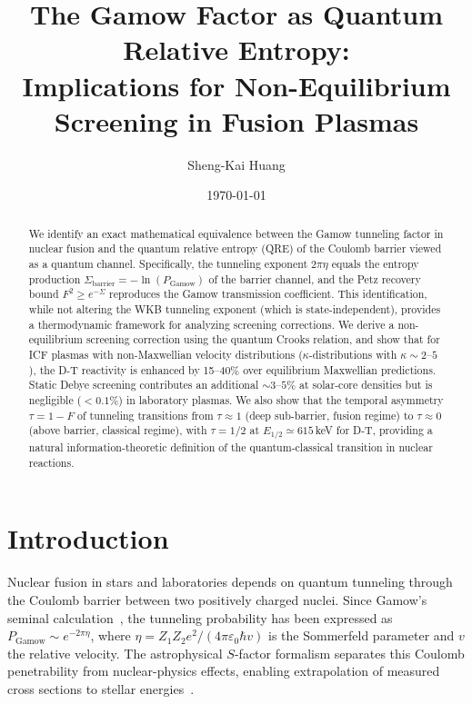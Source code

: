 \documentclass[prc,twocolumn,superscriptaddress,longbibliography,floatfix]{revtex4-2}
\newcommand{\tauasym}{\tau}
\newcommand{\PGam}{P_{\mathrm{Gamow}}}
\newcommand{\Sbar}{\Sigma_{\mathrm{barrier}}}
\begin{document}
\title{The Gamow Factor as Quantum Relative Entropy:\\
Implications for Non-Equilibrium Screening in Fusion Plasmas}

\author{Sheng-Kai Huang}

\date{\today}

\begin{abstract}
We identify an exact mathematical equivalence between the Gamow
tunneling factor in nuclear fusion and the quantum relative entropy (QRE)
of the Coulomb barrier viewed as a quantum channel.  Specifically, the
tunneling exponent $2\pi\eta$ equals the entropy production
$\Sbar = -\ln(\PGam)$ of the barrier channel, and the Petz recovery
bound $F^{2} \geq e^{-\Sigma}$ reproduces the Gamow transmission
coefficient.  This identification, while not altering the WKB tunneling
exponent (which is state-independent), provides a thermodynamic
framework for analyzing screening corrections.
We derive a non-equilibrium screening correction using the quantum
Crooks relation, and show that for ICF plasmas with non-Maxwellian
velocity distributions ($\kappa$-distributions with $\kappa \sim 2$--$5$),
the D-T reactivity is enhanced by 15--40\% over equilibrium Maxwellian
predictions.  Static Debye screening contributes an additional
$\sim 3$--$5\%$ at solar-core densities but is negligible
($<0.1\%$) in laboratory plasmas.
We also show that the temporal asymmetry
$\tauasym = 1 - F$ of tunneling transitions from $\tauasym \approx 1$
(deep sub-barrier, fusion regime) to $\tauasym \approx 0$ (above barrier,
classical regime), with $\tauasym = 1/2$ at
$E_{1/2} \simeq 615\,$keV for D-T, providing a natural
information-theoretic definition of the quantum-classical transition in
nuclear reactions.
\end{abstract}

\maketitle

\section{Introduction}
\label{sec:intro}

Nuclear fusion in stars and laboratories depends on quantum tunneling
through the Coulomb barrier between two positively charged nuclei.
Since Gamow's seminal calculation~\cite{Gamow1928}, the tunneling
probability has been expressed as $\PGam \sim e^{-2\pi\eta}$, where
$\eta = Z_{1}Z_{2}e^{2}/(4\pi\varepsilon_{0}\hbar v)$ is the
Sommerfeld parameter and $v$ the relative velocity.  The astrophysical
$S$-factor formalism separates this Coulomb penetrability from
nuclear-physics effects, enabling extrapolation of measured cross
sections to stellar energies~\cite{Bethe1938,Burbidge1957}.
\end{document}
